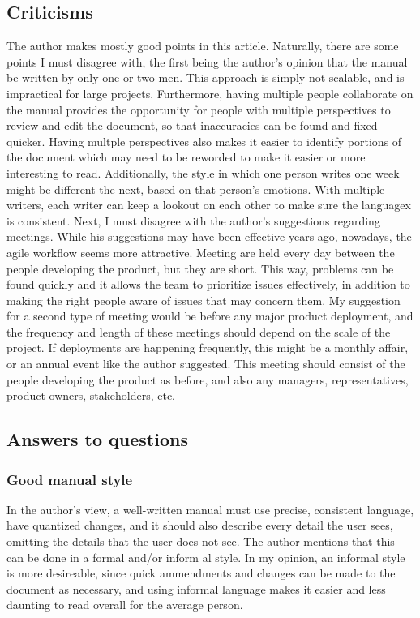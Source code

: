 \documentclass[letterpaper,12pt]{article}
\begin{document}
\subsection{Criticisms}
The author makes mostly good points in this article. Naturally, there are some
points I must disagree with, the first being the author's opinion that the
manual be written by only one or two men. This approach is simply not scalable,
and is impractical for large projects. Furthermore, having multiple people
collaborate on the manual provides the opportunity for people with multiple
perspectives to review and edit the document, so that inaccuracies  can be found
and fixed quicker. Having multple perspectives also makes it easier to identify
portions of the document which may need to be reworded to make it easier or more
interesting to read. Additionally, the style in which one person writes one week
might be different the next, based on that person's emotions. With multiple
writers, each writer can keep a lookout on each other to make sure the languagex
is consistent. Next, I must disagree with the author's suggestions regarding
meetings. While his suggestions may have been effective years ago, nowadays, the
agile workflow seems more attractive. Meeting are held every day between the
people developing the product, but they are short. This way, problems can be
found quickly and  it allows the team to prioritize issues effectively, in
addition to making the right people aware of issues that may concern them. My
suggestion for a second type of meeting would be before any major product
deployment, and the frequency and length of these meetings should depend on the
scale of the project. If deployments are happening frequently, this might be a
monthly affair, or an annual event like the author suggested. This meeting
should consist of the people developing the product as before, and also any
managers, representatives, product owners, stakeholders, etc.

\subsection{Answers to questions}
\subsubsection{Good manual style}

In the author's view, a well-written manual must use precise, consistent
language, have quantized changes, and  it should also describe every detail the
user sees, omitting the details that the user does not see. The author mentions
that this can be done in a formal and/or inform
al style. In my opinion, an
informal style is more desireable, since quick ammendments and changes can be made to
the document as necessary, and using informal language makes it easier and less
daunting to read overall for the average person.
\end{document}
